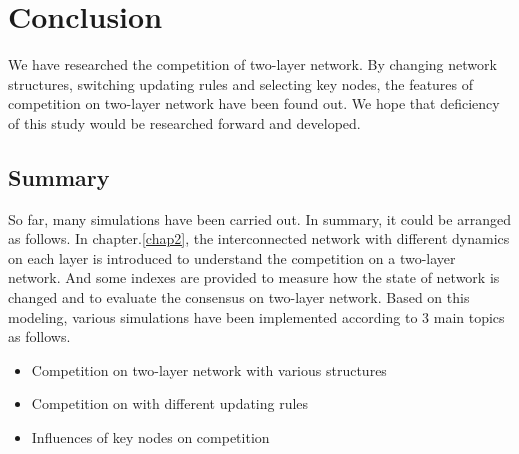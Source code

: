 
\chapter{Conclusion}
\label{chap6}
We have researched the competition of two-layer network. By changing network structures, switching updating rules and selecting key nodes, the features of competition on two-layer network have been found out. We hope that deficiency of this study would be researched forward and developed. 
\section{Summary}
So far, many simulations have been carried out. In summary, it could be arranged as follows. 
In chapter.\ref{chap2}, the interconnected network with different dynamics on each layer is introduced to understand the competition on a two-layer network.  And some indexes are provided to measure how the state of network is changed and to evaluate the consensus on two-layer network. Based on this modeling, various simulations have been implemented according to 3 main topics as follows.

\begin{itemize}
\item Competition on two-layer network with various structures
\item Competition on with different updating rules
\item Influences of key nodes on competition
\end{itemize}

